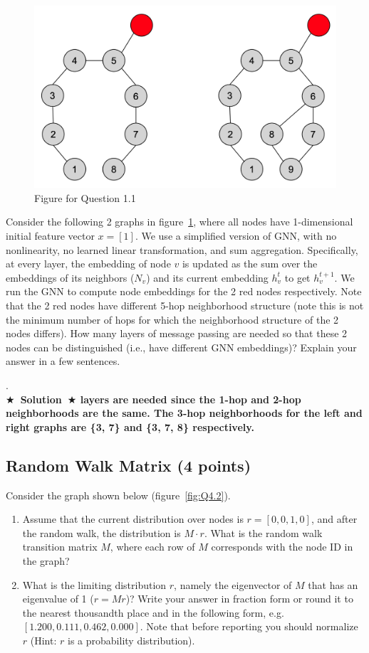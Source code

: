 \documentclass{article}
\numberwithin{figure}{section}
\newcommand{\Solution}[1]{{\medskip \color{red} \bf $\bigstar$~\sf \textbf{Solution}~$\bigstar$ \sf #1 } \bigskip}
\begin{document}
\begin{figure}[!htb]
  \centering
    \includegraphics[width=0.6\columnwidth]{CS224W_Homework1/fig4-1.png}
    \caption{Figure for Question 1.1}
    \label{fig:Q4.1}
  \end{figure}
Consider the following 2 graphs in figure~\ref{fig:Q4.1}, where all nodes have 1-dimensional initial feature vector $x = [1]$. We use a simplified version of GNN, with no nonlinearity,
no learned linear transformation, and sum aggregation. Specifically, at every
layer, the embedding of node $v$ is updated as the sum over the embeddings of
its neighbors ($N_v$) and its current embedding $h^t_v$ to get $h^{t+1}_v$. We run the GNN
to compute node embeddings for the 2 red nodes respectively. Note that the 2 red nodes have different 5-hop neighborhood structure (note this is not the minimum number of hops for which the neighborhood structure of the 2 nodes differs). How many layers of message passing are needed so that these 2 nodes can be distinguished (i.e., have different GNN embeddings)? Explain your answer in a few sentences.


.\\

\Solution{3 layers are needed since the 1-hop and 2-hop neighborhoods are the same. The 3-hop neighborhoods for the left and right graphs are \{3, 7\} and \{3, 7, 8\} respectively.
}

\subsection{Random Walk Matrix (4 points)}

Consider the graph shown below (figure~\ref{fig:Q4.2}).
\begin{enumerate}
    \item Assume that the current distribution over nodes is $r = [0,0,1,0]$, and after the random walk, the distribution is $M \cdot r$. What is the random walk transition matrix $M$, where each row of $M$ corresponds with the node ID in the graph?
    \item What is the limiting distribution $r$, namely the eigenvector of $M$ that has an eigenvalue of 1 ($r = Mr$)? Write your answer in fraction form or round it to the nearest thousandth place and in the following form, e.g. $[1.200, 0.111, 0.462, 0.000]$. Note that before reporting you should normalize $r$ (Hint: $r$ is a probability distribution).
\end{enumerate}
\end{document}
